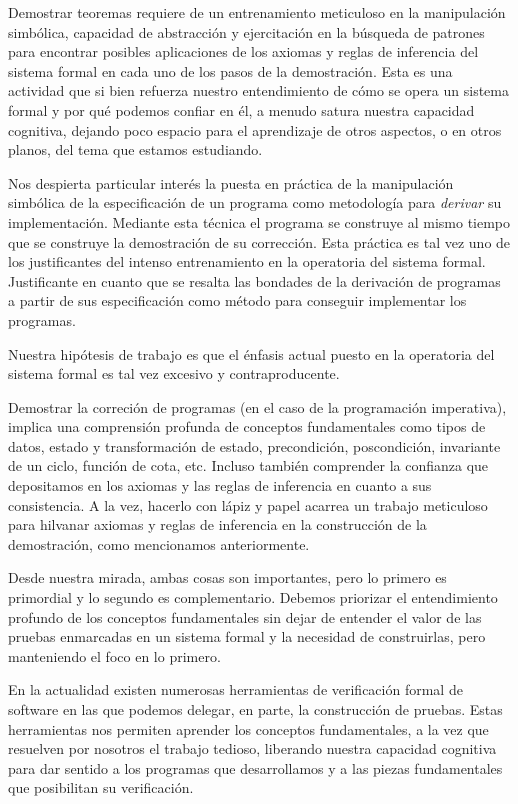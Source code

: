 \documentclass[12pt, a4paper, openany, fleqn]{book}
\begin{document}
    Demostrar teoremas requiere de un entrenamiento meticuloso en la manipulación simbólica, capacidad de abstracción y ejercitación en la búsqueda de patrones para encontrar posibles aplicaciones de los axiomas y reglas de inferencia del sistema formal en cada uno de los pasos de la demostración.
    Esta es una actividad que si bien refuerza nuestro entendimiento de cómo se opera un sistema formal y por qué podemos confiar en él, a menudo satura nuestra capacidad cognitiva, dejando poco espacio para el aprendizaje de otros aspectos, o en otros planos, del tema que estamos estudiando.

    Nos despierta particular interés la puesta en práctica de la manipulación simbólica de la especificación de un programa como metodología para \textit{derivar} su implementación. Mediante esta técnica el programa se construye al mismo tiempo que se construye la demostración de su corrección.
    Esta práctica es tal vez uno de los justificantes del intenso entrenamiento en la operatoria del sistema formal. Justificante en cuanto que se resalta las bondades de la derivación de programas a partir de sus especificación como método para conseguir implementar los programas.

    Nuestra hipótesis de trabajo es que el énfasis actual puesto en la operatoria del sistema formal es tal vez excesivo y contraproducente.

    Demostrar la correción de programas (en el caso de la programación imperativa), implica una comprensión profunda de conceptos fundamentales como tipos de datos, estado y transformación de estado, precondición, poscondición, invariante de un ciclo, función de cota, etc. Incluso también comprender la confianza que depositamos en los axiomas y las reglas de inferencia en cuanto a sus consistencia.
    A la vez, hacerlo con lápiz y papel acarrea un trabajo meticuloso para hilvanar axiomas y reglas de inferencia en la construcción de la demostración, como mencionamos anteriormente.

    Desde nuestra mirada, ambas cosas son importantes, pero lo primero es primordial y lo segundo es complementario. Debemos priorizar el entendimiento profundo de los conceptos fundamentales sin dejar de entender el valor de las pruebas enmarcadas en un sistema formal y la necesidad de construirlas, pero manteniendo el foco en lo primero.

    En la actualidad existen numerosas herramientas de verificación formal de software en las que podemos delegar, en parte, la construcción de pruebas. Estas herramientas nos permiten aprender los conceptos fundamentales, a la vez que resuelven por nosotros el trabajo tedioso, liberando nuestra capacidad cognitiva para dar sentido a los programas que desarrollamos y a las piezas fundamentales que posibilitan su verificación.
\end{document}
